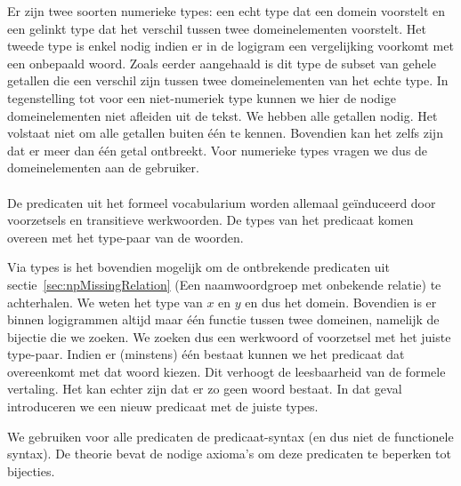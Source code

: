 Er zijn twee soorten numerieke types: een echt type dat een domein voorstelt en een gelinkt type dat het verschil tussen twee domeinelementen voorstelt. Het tweede type is enkel nodig indien er in de logigram een vergelijking voorkomt met een onbepaald woord. Zoals eerder aangehaald is dit type de subset van gehele getallen die een verschil zijn tussen twee domeinelementen van het echte type. In tegenstelling tot voor een niet-numeriek type kunnen we hier de nodige domeinelementen niet afleiden uit de tekst. We hebben alle getallen nodig. Het volstaat niet om alle getallen buiten één te kennen. Bovendien kan het zelfs zijn dat er meer dan één getal ontbreekt. Voor numerieke types vragen we dus de domeinelementen aan de gebruiker.

\paragraph{} De predicaten uit het formeel vocabularium worden allemaal geïnduceerd door voorzetsels en transitieve werkwoorden. De types van het predicaat komen overeen met het type-paar van de woorden. 

Via types is het bovendien mogelijk om de ontbrekende predicaten uit sectie~\ref{sec:npMissingRelation} (Een naamwoordgroep met onbekende relatie) te achterhalen. We weten het type van $x$ en $y$ en dus het domein. Bovendien is er binnen logigrammen altijd maar één functie tussen twee domeinen, namelijk de bijectie die we zoeken. We zoeken dus een werkwoord of voorzetsel met het juiste type-paar. Indien er (minstens) één bestaat kunnen we het predicaat dat overeenkomt met dat woord kiezen. Dit verhoogt de leesbaarheid van de formele vertaling. Het kan echter zijn dat er zo geen woord bestaat. In dat geval introduceren we een nieuw predicaat met de juiste types.

We gebruiken voor alle predicaten de predicaat-syntax (en dus niet de functionele syntax). De theorie bevat de nodige axioma's om deze predicaten te beperken tot bijecties.


